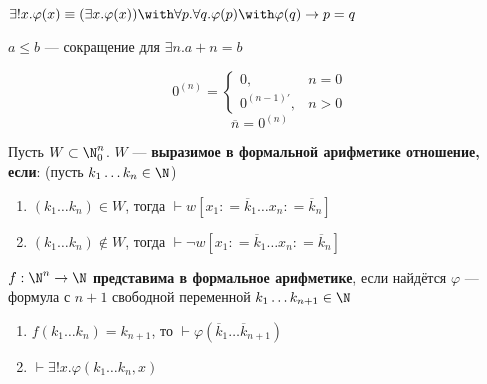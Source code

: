 \begin{definition}
    \(\exists !x.\varphi(x) \equiv (\exists x.\varphi(x)) \with \forall p.\forall q.\varphi(p) \with \varphi(q) \to p = q\)
\end{definition}

\begin{definition}
    \(a \leq b\) --- сокращение для \(\exists n.a + n = b\)
\end{definition}

\begin{definition}
    \[0^{(n)} = \begin{cases} 0, & n = 0 \\ 0^{(n - 1)'}, & n > 0 \end{cases}\]
    \[\overline n = 0^{(n)} \]
\end{definition}

\begin{definition}
    Пусть \(W \subset \N_0^n\). \(W\) --- \textbf{выразимое в формальной арифметике отношение, если}: (пусть \(k_1 \dots k_n \in \N\))
    \begin{enumerate}
        \item \((k_1\dots k_n)\in W\), тогда \(\vdash w[x_1: = \overline k_1 \dots x_n: = \overline k_n]\)
        \item \((k_1\dots k_n)\notin W\), тогда \(\vdash \neg w[x_1: = \overline k_1 \dots x_n: = \overline k_n]\)
    \end{enumerate}
\end{definition}

\begin{definition}
    \(f : \N^n \to \N\) \textbf{представима в формальное арифметике}, если найдётся \(\varphi\) --- формула с \(n + 1\) свободной переменной \(k_1 \dots k_{n+1} \in \N\)
    \begin{enumerate}
        \item \(f(k_1\dots k_n) = k_{n+1}\), то \(\vdash \varphi(\overline k_1 \dots \overline k_{n+1})\)
        \item \(\vdash \exists ! x.\varphi(k_1 \dots k_n, x)\)
    \end{enumerate}
\end{definition}
